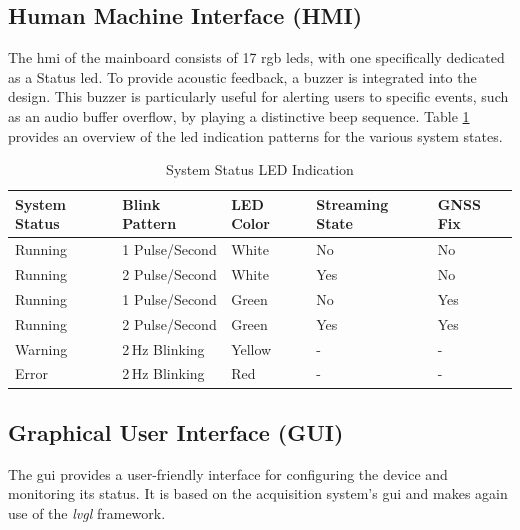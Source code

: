 \newpage
\subsection{Human Machine Interface (HMI)}
The \acrfull{hmi} of the mainboard consists of 17 \acrshort{rgb} \acrshort{led}s, with one specifically dedicated as a Status \acrshort{led}.
To provide acoustic feedback, a buzzer is integrated into the design.
This buzzer is particularly useful for alerting users to specific events, such as an audio buffer overflow, by playing a distinctive beep sequence.
Table \ref{tab:system_status_led} provides an overview of the \acrshort{led} indication patterns for the various system states.
\begin{table}[h!]
	\centering
	\begin{tabular}{ l l l l l}
		\textbf{System Status} & \textbf{Blink Pattern} & \textbf{LED Color} & \textbf{Streaming State} & \textbf{GNSS Fix} \vspace{0.1cm} \\ \hline
		Running                & 1 Pulse/Second         & White              & No                       & No                               \\ \hline
		Running                & 2 Pulse/Second         & White              & Yes                      & No                               \\ \hline
		Running                & 1 Pulse/Second         & Green              & No                       & Yes                              \\ \hline
		Running                & 2 Pulse/Second         & Green              & Yes                      & Yes                              \\ \hline
		Warning                & 2\,Hz Blinking         & Yellow             & -                        & -                                \\ \hline
		Error                  & 2\,Hz Blinking         & Red                & -                        & -                                \\ \hline
	\end{tabular}
	\caption{System Status LED Indication}
	\label{tab:system_status_led}
\end{table}

\subsection{Graphical User Interface (GUI)}
The \acrshort{gui} provides a user-friendly interface for configuring the device and monitoring its status.
It is based on the acquisition system's \acrshort{gui} and makes again use of the \textit{lvgl} framework.

